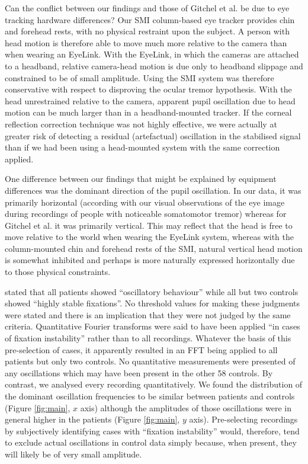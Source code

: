 \documentclass[jou,a4paper]{apa6}
\begin{document}
Can the conflict between our findings and those of Gitchel et al. be due to eye tracking hardware differences? Our SMI column-based eye tracker provides chin and forehead rests, with no physical restraint upon the subject. A person with head motion is therefore able to move much more relative to the camera than when wearing an EyeLink. With the EyeLink, in which the cameras are attached to a headband, relative camera-head motion is due only to headband slippage and constrained to be of small amplitude. Using the SMI system was therefore conservative with respect to disproving the ocular tremor hypothesis. With the head unrestrained relative to the camera, apparent pupil oscillation due to head motion can be much larger than in a headband-mounted tracker. If the corneal reflection correction technique was not highly effective, we were actually at greater risk of detecting a residual (artefactual) oscillation in the stabilised signal than if we had been using a head-mounted system with the same correction applied. 

One difference between our findings that might be explained by equipment differences was the dominant direction of the pupil oscillation. In our data, it was primarily horizontal (according with our visual observations of the eye image during recordings of people with noticeable somatomotor tremor) whereas for Gitchel et al. it was primarily vertical. This may reflect that the head is free to move relative to the world when wearing the EyeLink system, whereas with the column-mounted chin and forehead rests of the SMI, natural vertical head motion is somewhat inhibited and perhaps is more naturally expressed horizontally due to those physical constraints.

\citet{Gitchel2012Pervasive-ocula} stated that all patients showed ``oscillatory behaviour'' while all but two controls showed ``highly stable fixations''. No threshold values for making these judgments were stated and there is an implication that they were not judged by the same criteria. Quantitative Fourier transforms were said to have been applied ``in cases of fixation instability'' rather than to all recordings. Whatever the basis of this pre-selection of cases, it apparently resulted in an FFT being applied to all patients but only two controls. No quantitative measurements were presented of any oscillations which may have been present in the other 58 controls. By contrast, we analysed every recording quantitatively. We found the distribution of the dominant oscillation frequencies to be similar between patients and controls (Figure \ref{fig:main}, $x$ axis) although the amplitudes of those oscillations were in general higher in the patients (Figure \ref{fig:main}, $y$ axis). Pre-selecting recordings by subjectively identifying cases with ``fixation instability'' would, therefore, tend to exclude actual oscillations in control data simply because, when present, they will likely be of very small amplitude.
\end{document}
